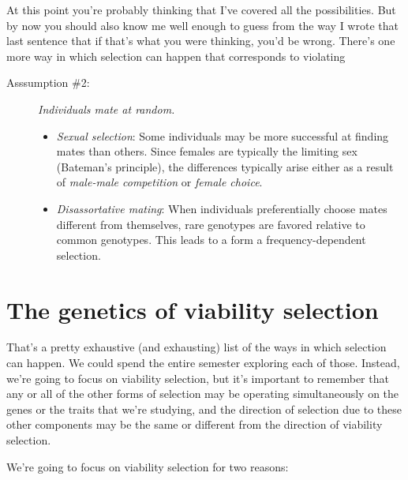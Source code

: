 \documentclass[12pt]{article}
\begin{document}
At this point you're probably thinking that I've covered all the
possibilities. But by now you should also know me well enough to guess
from the way I wrote that last sentence that if that's what you were
thinking, you'd be wrong. There's one more way in which selection can
happen that corresponds to violating

\begin{description}

\item[Asssumption \#2:] {\it Individuals mate at random.}

\begin{itemize}

\item {\it Sexual selection\/}: Some individuals may be more
  successful at finding mates than others. Since females are typically
  the limiting sex (Bateman's principle), the differences typically
  arise either as a result of {\it male-male competition\/} or {\it
    female choice}.

\item {\it Disassortative mating\/}: When individuals preferentially
  choose mates different from themselves, rare genotypes are favored
  relative to common genotypes. This leads to a form a
  frequency-dependent selection.

\end{itemize}

\end{description}

\section*{The genetics of viability selection}

That's a pretty exhaustive (and exhausting) list of the ways in which
selection can happen. We could spend the entire semester exploring
each of those. Instead, we're going to focus on viability
selection, but it's important to remember that any or all of the other
forms of selection may be operating simultaneously on the genes or the
traits that we're studying, and the direction of selection due to
these other components may be the same or different from the direction
of viability selection.

We're going to focus on viability selection for two reasons:
\end{document}
